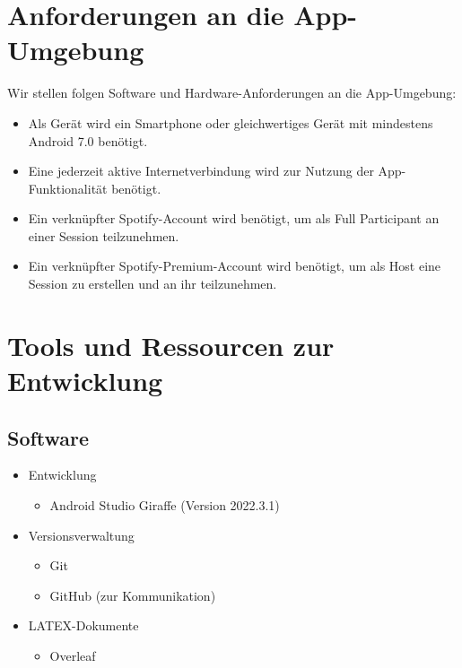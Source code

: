 \documentclass[oneside, ngerman]{sdqtechreport}
\begin{document}
\chapter{Anforderungen an die App-Umgebung}
\label{chap:Appumgebung}

Wir stellen folgen Software und Hardware-Anforderungen an die App-Umgebung:

\begin{itemize}
    \item Als Gerät wird ein Smartphone oder gleichwertiges Gerät mit mindestens Android 7.0 benötigt.
    \item Eine jederzeit aktive Internetverbindung wird zur Nutzung der App-Funktionalität benötigt.
    \item Ein verknüpfter Spotify-Account wird benötigt, um als Full Participant an einer Session teilzunehmen.
    \item Ein verknüpfter Spotify-Premium-Account wird benötigt, um als Host eine Session zu erstellen und an ihr teilzunehmen.
\end{itemize}




\chapter{Tools und Ressourcen zur Entwicklung}
\label{chap:Entwicklungsumgebung}

\section{Software}
\label{sec:Entwicklungsumgebung:Software}

\begin{itemize}
    \item Entwicklung
    \begin{itemize}
        \item Android Studio Giraffe (Version 2022.3.1)
    \end{itemize}
    
    \item Versionsverwaltung
    \begin{itemize}
        \item Git
        \item GitHub (zur Kommunikation)
    \end{itemize}

    \item LATEX-Dokumente
    \begin{itemize}
        \item Overleaf
    \end{itemize}
    
\end{itemize}
\end{document}
